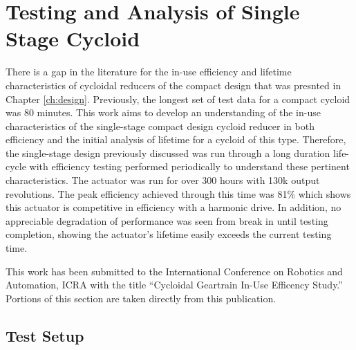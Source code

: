 
\chapter{Testing and Analysis of Single Stage Cycloid}\label{ch:single}

There is a gap in the literature for the in-use efficiency and lifetime characteristics of cycloidal reducers of the compact design that was presnted in Chapter \ref{ch:design}. Previously, the longest set of test data for a compact cycloid was 80 minutes. This work aims to develop an understanding of the in-use characteristics of the single-stage compact design cycloid reducer in both efficiency and the initial analysis of lifetime for a cycloid of this type. Therefore, the single-stage design previously discussed was run through a long duration life-cycle with efficiency testing performed periodically to understand these pertinent characteristics. The actuator was run for over 300 hours with 130k output revolutions. The peak efficiency achieved through this time was 81\% which shows this actuator is competitive in efficiency with a harmonic drive. In addition, no appreciable degradation of performance was seen from break in until testing completion, showing the actuator's lifetime easily exceeds the current testing time.  

This work has been submitted to the International Conference on Robotics and Automation, ICRA with the title ``Cycloidal Geartrain In-Use Efficency Study.'' Portions of this section are taken directly from this publication. 

\section{Test Setup} \label{ch:single:test_setupd}

